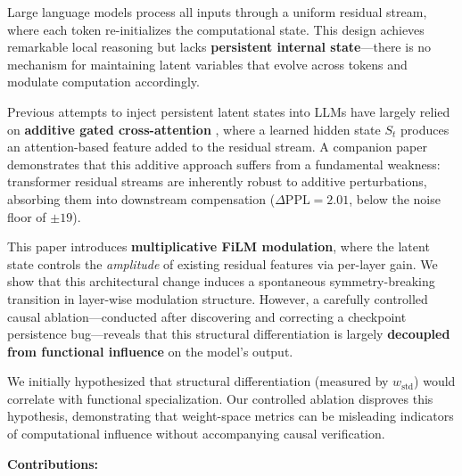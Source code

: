 \documentclass[11pt,a4paper]{article}
\newcommand{\St}{S_t}
\begin{document}
Large language models process all inputs through a uniform residual stream, where
each token re-initializes the computational state. This design achieves remarkable
local reasoning but lacks \textbf{persistent internal state}---there is no mechanism
for maintaining latent variables that evolve across tokens and modulate computation
accordingly.

Previous attempts to inject persistent latent states into LLMs have largely relied on
\textbf{additive gated cross-attention} \cite{sukhbaatar2019augmenting,
wu2022memorizing}, where a learned hidden state $\St$ produces an attention-based
feature added to the residual stream. A companion paper \cite{plaa1} demonstrates
that this additive approach suffers from a fundamental weakness: transformer residual
streams are inherently robust to additive perturbations, absorbing them into
downstream compensation ($\Delta\mathrm{PPL} = 2.01$, below the noise floor of
$\pm 19$).

This paper introduces \textbf{multiplicative FiLM modulation}, where the latent
state controls the \emph{amplitude} of existing residual features via per-layer gain.
We show that this architectural change induces a spontaneous symmetry-breaking
transition in layer-wise modulation structure. However, a carefully controlled causal
ablation---conducted after discovering and correcting a checkpoint persistence
bug---reveals that this structural differentiation is largely \textbf{decoupled from
functional influence} on the model's output.

We initially hypothesized that structural differentiation (measured by
$w_{\mathrm{std}}$) would correlate with functional specialization. Our controlled
ablation disproves this hypothesis, demonstrating that weight-space metrics can be
misleading indicators of computational influence without accompanying causal
verification.

\textbf{Contributions:}
\end{document}
